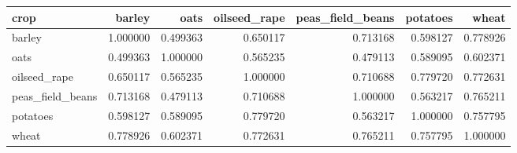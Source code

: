 \begin{tabular}{lrrrrrr}
\toprule
crop & barley & oats & oilseed\_rape & peas\_field\_beans & potatoes & wheat \\
\midrule
barley & 1.000000 & 0.499363 & 0.650117 & 0.713168 & 0.598127 & 0.778926 \\
oats & 0.499363 & 1.000000 & 0.565235 & 0.479113 & 0.589095 & 0.602371 \\
oilseed\_rape & 0.650117 & 0.565235 & 1.000000 & 0.710688 & 0.779720 & 0.772631 \\
peas\_field\_beans & 0.713168 & 0.479113 & 0.710688 & 1.000000 & 0.563217 & 0.765211 \\
potatoes & 0.598127 & 0.589095 & 0.779720 & 0.563217 & 1.000000 & 0.757795 \\
wheat & 0.778926 & 0.602371 & 0.772631 & 0.765211 & 0.757795 & 1.000000 \\
\bottomrule
\end{tabular}

